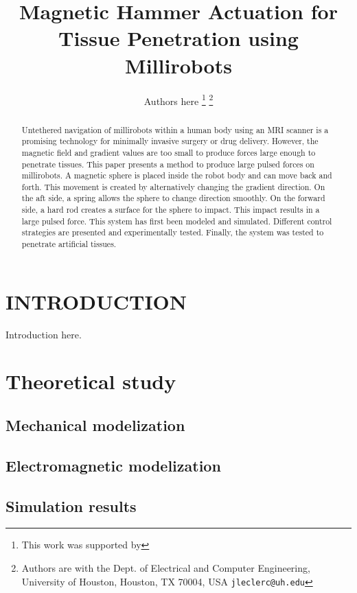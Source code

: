\documentclass[letterpaper, 10 pt, conference]{ieeeconf}  %
\title{\LARGE \bf
Magnetic Hammer Actuation for Tissue Penetration using Millirobots
}
\author{Authors here%
\thanks{This work was supported by }%
\thanks{Authors are with the Dept. of Electrical and Computer
Engineering, University of Houston, Houston, TX 70004, USA
        {\tt\small jleclerc@uh.edu}}%
}
\begin{document}
\maketitle
\thispagestyle{empty}
\pagestyle{empty}


\begin{abstract}

Untethered navigation of millirobots within a human body using an MRI scanner is a promising technology for minimally invasive surgery or drug delivery. However, the magnetic field and gradient values are too small to produce forces large enough to penetrate tissues. This paper presents a method to produce large pulsed forces on millirobots. A magnetic sphere is placed inside the robot body and can move back and forth. This movement is created by alternatively changing the gradient direction. On the aft side, a spring allows the sphere to change direction smoothly. On the forward side, a hard rod creates a surface for the sphere to impact. This impact results in a large pulsed force. This system has first been modeled and simulated. Different control strategies are presented and experimentally tested. Finally, the system was tested to penetrate artificial tissues. 

\end{abstract}


\section{INTRODUCTION}

Introduction here.

\section{Theoretical study}

\subsection{Mechanical modelization}

\subsection{Electromagnetic modelization}

\subsection{Simulation results}
\end{document}
